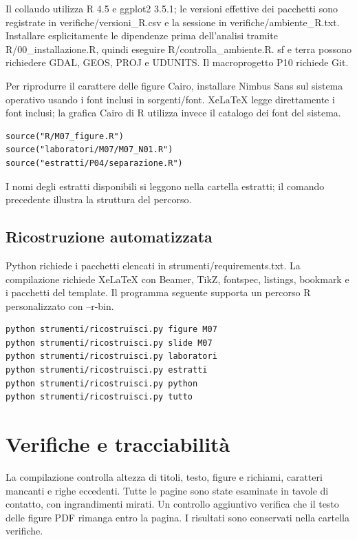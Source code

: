 \documentclass[11pt,a4paper]{article}
\begin{document}
Il collaudo utilizza R 4.5 e ggplot2 3.5.1; le versioni effettive dei pacchetti sono registrate in verifiche/versioni\_R.csv e la sessione in verifiche/ambiente\_R.txt. Installare esplicitamente le dipendenze prima dell’analisi tramite R/00\_installazione.R, quindi eseguire R/controlla\_ambiente.R. sf e terra possono richiedere GDAL, GEOS, PROJ e UDUNITS. Il macroprogetto P10 richiede Git.

Per riprodurre il carattere delle figure Cairo, installare Nimbus Sans sul sistema operativo usando i font inclusi in sorgenti/font. XeLaTeX legge direttamente i font inclusi; la grafica Cairo di R utilizza invece il catalogo dei font del sistema.

\begin{verbatim}source("R/M07_figure.R")
source("laboratori/M07/M07_N01.R")
source("estratti/P04/separazione.R")
\end{verbatim}

I nomi degli estratti disponibili si leggono nella cartella estratti; il comando precedente illustra la struttura del percorso.

\subsection*{Ricostruzione automatizzata}

Python richiede i pacchetti elencati in strumenti/requirements.txt. La compilazione richiede XeLaTeX con Beamer, TikZ, fontspec, listings, bookmark e i pacchetti del template. Il programma seguente supporta un percorso R personalizzato con --r-bin.

\begin{verbatim}python strumenti/ricostruisci.py figure M07
python strumenti/ricostruisci.py slide M07
python strumenti/ricostruisci.py laboratori
python strumenti/ricostruisci.py estratti
python strumenti/ricostruisci.py python
python strumenti/ricostruisci.py tutto
\end{verbatim}

\newpage\section*{Verifiche e tracciabilità}

La compilazione controlla altezza di titoli, testo, figure e richiami, caratteri mancanti e righe eccedenti. Tutte le pagine sono state esaminate in tavole di contatto, con ingrandimenti mirati. Un controllo aggiuntivo verifica che il testo delle figure PDF rimanga entro la pagina. I risultati sono conservati nella cartella verifiche.
\end{document}
